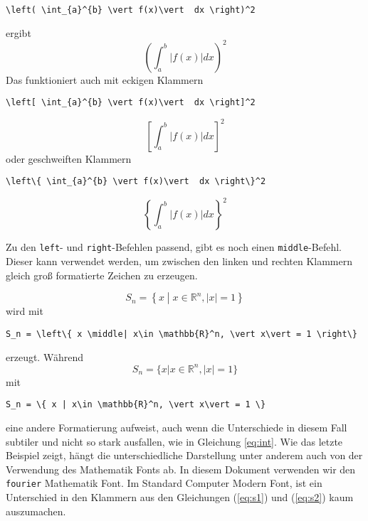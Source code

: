 \begin{verbatim}
\left( \int_{a}^{b} \vert f(x)\vert  dx \right)^2
\end{verbatim}
ergibt
\begin{equation*}
\left( \int_{a}^{b} \vert f(x)\vert  dx \right)^2
\end{equation*}
Das funktioniert auch mit eckigen Klammern
\begin{verbatim}
\left[ \int_{a}^{b} \vert f(x)\vert  dx \right]^2
\end{verbatim}
\begin{equation*}
\left[ \int_{a}^{b} \vert f(x)\vert  dx \right]^2
\end{equation*}
oder geschweiften Klammern
\begin{verbatim}
\left\{ \int_{a}^{b} \vert f(x)\vert  dx \right\}^2
\end{verbatim}
\begin{equation*}
\left\{ \int_{a}^{b} \vert f(x)\vert  dx \right\}^2
\end{equation*}

Zu den \texttt{left}- und \texttt{right}-Befehlen passend, gibt es noch einen \texttt{middle}-Befehl. Dieser kann verwendet werden, um zwischen den linken und rechten Klammern gleich groß formatierte Zeichen zu erzeugen.

\begin{equation}\label{eq:s1}
S_n = \left\{ x \middle| x\in \mathbb{R}^n, \vert x\vert = 1 \right\}
\end{equation}
wird mit 
\begin{verbatim}
S_n = \left\{ x \middle| x\in \mathbb{R}^n, \vert x\vert = 1 \right\}
\end{verbatim}
erzeugt. Während 
\begin{equation}\label{eq:s2}
S_n = \{ x | x\in \mathbb{R}^n, \vert x\vert = 1 \}
\end{equation}
mit
\begin{verbatim}
S_n = \{ x | x\in \mathbb{R}^n, \vert x\vert = 1 \}
\end{verbatim}
eine andere Formatierung aufweist, auch wenn die Unterschiede in diesem Fall subtiler und nicht so stark ausfallen, wie in Gleichung \ref{eq:int}. Wie das letzte Beispiel zeigt, hängt die unterschiedliche Darstellung unter anderem auch von der Verwendung des Mathematik Fonts ab. In diesem Dokument verwenden wir den \texttt{fourier} Mathematik Font. Im Standard Computer Modern Font, ist ein Unterschied in den Klammern aus den Gleichungen (\ref{eq:s1}) und (\ref{eq:s2}) kaum auszumachen. 

